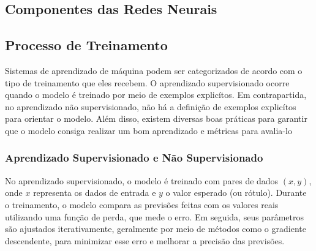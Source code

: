     \subsection{Componentes das Redes Neurais}


    \subsection{Processo de Treinamento}
        Sistemas de aprendizado de máquina podem ser categorizados de acordo com o tipo de treinamento que
        eles recebem. O aprendizado supervisionado ocorre quando o modelo é treinado por meio de exemplos explicítos. 
        Em contrapartida, no aprendizado não supervisionado, não há a definição de exemplos explicítos para orientar o 
        modelo. Além disso, existem diversas boas práticas para garantir que o modelo consiga realizar um bom aprendizado 
        e métricas para avalia-lo
         
        \subsubsection{Aprendizado Supervisionado e Não Supervisionado}  
            No aprendizado supervisionado, o modelo é treinado com pares de dados \((x,y)\), onde \(x\) representa 
            os dados de entrada e \(y\) o valor esperado (ou rótulo). Durante o treinamento, o modelo compara as 
            previsões feitas com os valores reais utilizando uma função de perda, que mede o erro. Em seguida, 
            seus parâmetros são ajustados iterativamente, geralmente por meio de métodos como o gradiente descendente, 
            para minimizar esse erro e melhorar a precisão das previsões.
            
